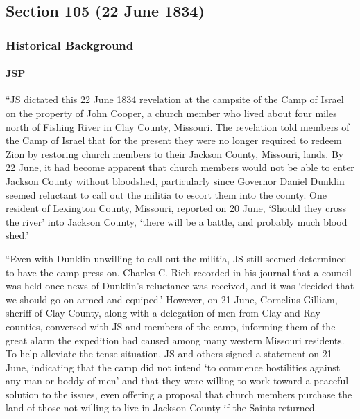 \subsection{Section 105 (22 June 1834)}
	\label{DC105}
	
	\subsubsection{Historical Background}
		\label{DC105-HB}
		
		\paragraph{JSP}
		
			``JS dictated this 22 June 1834 revelation at the campsite of the Camp of Israel on the property of John Cooper, a church member who lived about four miles north of Fishing River in Clay County, Missouri. The revelation told members of the Camp of Israel that for the present they were no longer required to redeem Zion by restoring church members to their Jackson County, Missouri, lands. By 22 June, it had become apparent that church members would not be able to enter Jackson County without bloodshed, particularly since Governor Daniel Dunklin seemed reluctant to call out the militia to escort them into the county. One resident of Lexington County, Missouri, reported on 20 June, `Should they cross the river' into Jackson County, `there will be a battle, and probably much blood shed.'
			
			``Even with Dunklin unwilling to call out the militia, JS still seemed determined to have the camp press on. Charles C. Rich recorded in his journal that a council was held once news of Dunklin's reluctance was received, and it was `decided that we should go on armed and equiped.' However, on 21 June, Cornelius Gilliam, sheriff of Clay County, along with a delegation of men from Clay and Ray counties, conversed with JS and members of the camp, informing them of the great alarm the expedition had caused among many western Missouri residents. To help alleviate the tense situation, JS and others signed a statement on 21 June, indicating that the camp did not intend `to commence hostilities against any man or boddy of men' and that they were willing to work toward a peaceful solution to the issues, even offering a proposal that church members purchase the land of those not willing to live in Jackson County if the Saints returned.
			
